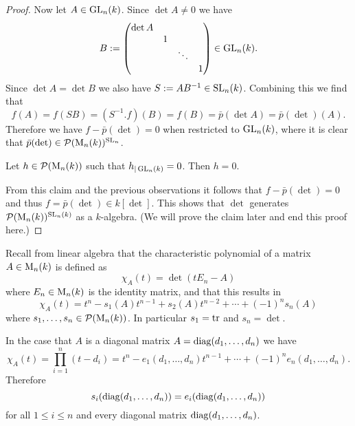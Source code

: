 \begin{proof}
 Now let $A \in \operatorname{GL}_n(k)$. Since $\det A \neq 0$ we have
 \[
  B :=
  \begin{pmatrix}
   \det A &   &        &   \\
          & 1 &        &   \\
          &   & \ddots &   \\
          &   &        & 1 \\
  \end{pmatrix}
  \in \operatorname{GL}_n(k).
 \]
 Since $\det A = \det B$ we also have $S := AB^{-1} \in \operatorname{SL}_n(k)$. Combining this we find that
 \[
  f(A) = f(SB) = \left(S^{-1}.f\right)(B) = f(B) = \bar{p}(\det A) = \bar{p}(\det)(A).
 \]
 Therefore we have $f - \bar{p}(\det) = 0$ when restricted to $\operatorname{GL}_n(k)$, where it is clear that $\bar{p}(\det) \in \mathcal{P}(\operatorname{M}_n(k))^{\operatorname{SL}_n}$.
 
 \begin{claim}
  Let $h \in \mathcal{P}(\operatorname{M}_n(k))$ such that $h_{|\operatorname{GL}_n(k)} = 0$. Then $h = 0$.
 \end{claim}
 
 From this claim and the previous observations it follows that $f - \bar{p}(\det) = 0$ and thus $f = \bar{p}(\det) \in k[\det]$. This shows that $\det$ generates $\mathcal{P}(\operatorname{M}_n(k))^{\operatorname{SL}_n(k)}$ as a $k$-algebra. (We will prove the claim later and end this proof here.)
\end{proof}


Recall from linear algebra that the characteristic polynomial of a matrix $A \in \operatorname{M}_n(k)$ is defined as
\[
 \chi_A(t) = \det(t E_n - A)
\]
where $E_n \in \operatorname{M}_n(k)$ is the identity matrix, and that this results in
\[
 \chi_A(t) = t^n - s_1(A) t^{n-1} + s_2(A) t^{n-2} + \dotsb + (-1)^n s_n(A)
\]
where $s_1, \dotsc, s_n \in \mathcal{P}(\operatorname{M}_n(k))$. In particular $s_1 = \operatorname{tr}$ and $s_n = \det$.

In the case that $A$ is a diagonal matrix $A = \operatorname{diag}(d_1, \dotsc, d_n)$ we have
\[
 \chi_A(t)
 = \prod_{i=1}^n (t-d_i)
 = t^n - e_1(d_1, \dotsc, d_n) t^{n-1} + \dotsb + (-1)^n e_n(d_1, \dotsc, d_n).
\]
Therefore
\[
 s_i(\operatorname{diag}(d_1, \dotsc, d_n)) = e_i(\operatorname{diag}(d_1, \dotsc, d_n))
\]
for all $1 \leq i \leq n$ and every diagonal matrix $\operatorname{diag}(d_1, \dotsc, d_n)$.


